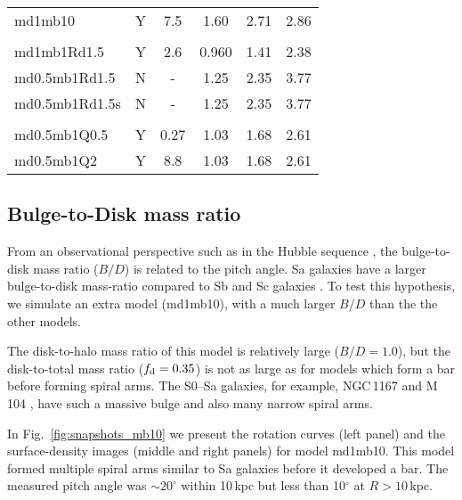 \begin{table*}
\begin{center}
\begin{tabular}{lccccc}
md1mb10    & Y  & 7.5 & 1.60 &  2.71 & 2.86 \\%
\\
md1mb1Rd1.5   & Y & 2.6 & 0.960  & 1.41 & 2.38 \\%
md0.5mb1Rd1.5 & N & - & 1.25 & 2.35 & 3.77 \\%
md0.5mb1Rd1.5s & N & - & 1.25 & 2.35 & 3.77 \\%
\\
md0.5mb1Q0.5 &  Y & 0.27 & 1.03 & 1.68 & 2.61 \\%
md0.5mb1Q2   &  Y & 8.8 & 1.03 & 1.68 & 2.61 \\%
\hline
\end{tabular}
\end{center}
\end{table*}


\subsection{Bulge-to-Disk mass ratio}

From an observational perspective such as in the Hubble sequence \citep{1926ApJ....64..321H}, 
the bulge-to-disk mass ratio ($B/D$) is related to the pitch angle. 
Sa galaxies have a larger bulge-to-disk mass-ratio
compared to Sb and Sc galaxies \citep{1961hag..book.....S}.
To test this hypothesis, we simulate an extra model (md1mb10), with a much larger $B/D$ than the 
the other models. 


The disk-to-halo mass ratio of this model is relatively large  ($B/D=1.0$),
but the disk-to-total mass ratio ($f_{\rm d}=0.35$) is not 
as large as for models which form a bar before forming spiral arms.
The S0--Sa galaxies, for example,
NGC\,1167 \citep{2008ARep...52...79Z} and M\,104
\citep{2006MNRAS.371.1269T}, have such a massive bulge and also many
narrow spiral arms. 

In Fig.~\ref{fig:snapshots_mb10} we present the rotation curves (left
panel) and the surface-density images (middle and right panels) for model
md1mb10.  This model formed multiple spiral arms similar to Sa galaxies 
before it developed a bar. 
The measured pitch angle was $\sim 20^{\circ}$ within 10\,kpc 
but less than 10$^{\circ}$ at $R>10$\,kpc. 

